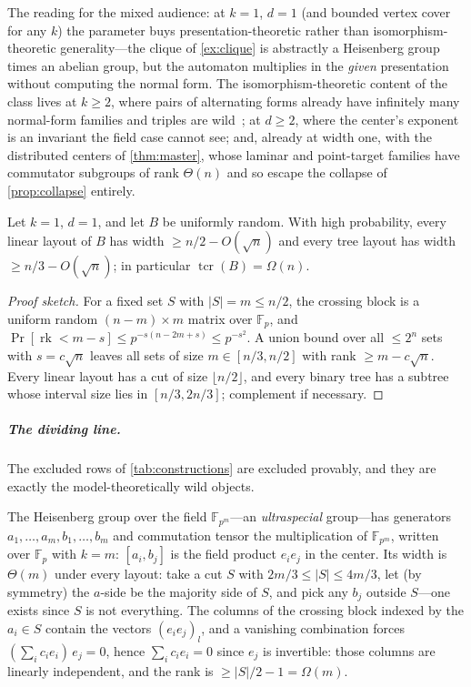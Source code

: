 \documentclass[a4paper,UKenglish,autoref,anonymous]{lipics-v2021}
\newcommand{\Fp}{\mathbb{F}_p}
\newcommand{\rk}{\operatorname{rk}}
\newcommand{\tcr}{\operatorname{tcr}}
\begin{document}
The reading for the mixed audience: at $k = 1$, $d = 1$ (and bounded
vertex cover for any $k$) the parameter buys presentation-theoretic
rather than isomorphism-theoretic generality---the clique of
\autoref{ex:clique} is abstractly a Heisenberg group times an abelian
group, but the automaton multiplies in the \emph{given} presentation
without computing the normal form. The isomorphism-theoretic content of
the class lives at $k \ge 2$, where pairs of alternating forms already
have infinitely many normal-form families and triples are
wild~\cite{GrochowQiao2021}; at $d \ge 2$, where the center's exponent
is an invariant the field case cannot see; and, already at width one,
with the distributed centers of \autoref{thm:master}, whose laminar and
point-target families have commutator subgroups of rank $\Theta(n)$ and
so escape the collapse of \autoref{prop:collapse} entirely.

\begin{proposition}
\label{prop:generic}
Let $k = 1$, $d = 1$, and let $B$ be uniformly random. With high
probability, every linear layout of $B$ has width $\ge n/2 -
O(\sqrt{n})$ and every tree layout has width $\ge n/3 - O(\sqrt{n})$;
in particular $\tcr(B) = \Omega(n)$.
\end{proposition}

\begin{proof}[Proof sketch]
For a fixed set $S$ with $|S| = m \le n/2$, the crossing block is a
uniform random $(n-m) \times m$ matrix over $\Fp$, and $\Pr[\rk < m -
s] \le p^{-s(n-2m+s)} \le p^{-s^2}$. A union bound over all $\le 2^n$
sets with $s = c\sqrt{n}$ leaves all sets of size $m \in [n/3, n/2]$
with rank $\ge m - c\sqrt n$. Every linear layout has a cut of size
$\lfloor n/2 \rfloor$, and every binary tree has a subtree whose
interval size lies in $[n/3, 2n/3]$; complement if necessary.
\end{proof}

\subparagraph*{The dividing line.}
The excluded rows of \autoref{tab:constructions} are excluded provably,
and they are exactly the model-theoretically wild objects.

\begin{example}
\label{ex:ultraspecial}
The Heisenberg group over the field $\mathbb{F}_{p^m}$---an
\emph{ultraspecial} group---has generators $a_1, \dots, a_m, b_1,
\dots, b_m$ and commutation tensor the multiplication of
$\mathbb{F}_{p^m}$, written over $\Fp$ with $k = m$: $[a_i, b_j]$ is
the field product $e_i e_j$ in the center. Its width is $\Theta(m)$
under every layout: take a cut $S$ with $2m/3 \le |S| \le 4m/3$, let
(by symmetry) the $a$-side be the majority side of $S$, and pick any
$b_j$ outside $S$---one exists since $S$ is not everything. The columns
of the crossing block indexed by the $a_i \in S$ contain the vectors
$(e_i e_j)_l$, and a vanishing combination forces $(\sum_i c_i e_i)\,
e_j = 0$, hence $\sum_i c_i e_i = 0$ since $e_j$ is invertible: those
columns are linearly independent, and the rank is $\ge |S|/2 - 1 =
\Omega(m)$.
\end{example}
\end{document}
